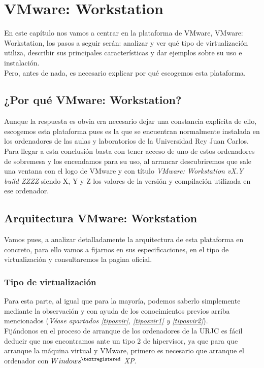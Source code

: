 \chapter{VMware: Workstation}
En este capítulo nos vamos a centrar en la plataforma de VMware, VMware: Workstation\cite{vmwarework}, los pasos a seguir serán: analizar y ver qué tipo de virtualización utiliza, describir sus principales características y dar ejemplos sobre su uso e instalación.\\

Pero, antes de nada, es necesario explicar por qué escogemos esta plataforma.

\section{¿Por qué VMware: Workstation?}
Aunque la respuesta es obvia era necesario dejar una constancia explícita de ello, escogemos esta plataforma pues es la que se encuentran normalmente instalada en los ordenadores de las aulas y laboratorios de la Universidad Rey Juan Carlos.\\

Para llegar a esta conclusión basta con tener acceso de uno de estos ordenadores de sobremesa y los encendamos para su uso, al arrancar descubriremos que sale una ventana con el logo de VMware y con título \emph{VMware: Workstation vX.Y build ZZZZ} siendo X, Y y Z los valores de la versión y compilación utilizada en ese ordenador.

\section{Arquitectura VMware: Workstation}
Vamos pues, a analizar detalladamente la arquitectura de esta plataforma en concreto, para ello vamos a fijarnos en sus especificaciones, en el tipo de virtualización y consultaremos la pagina oficial\cite{vmwarework}\cite{vmwareworkhelp}.

\subsection{Tipo de virtualización}
Para esta parte, al igual que para la mayoría, podemos saberlo simplemente mediante la observación y con ayuda de los conocimientos previos arriba mencionados (\textit{Véase apartados \ref{tiposvir}, \ref{tiposvir1} y \ref{tiposvir2}}).\\

Fijándonos en el proceso de arranque de los ordenadores de la URJC es fácil deducir que nos encontramos ante un tipo 2 de hipervisor, ya que para que arranque la máquina virtual y VMware, primero es necesario que arranque el ordenador con \emph{$Windows^{\textregistered}$ XP}.\\

